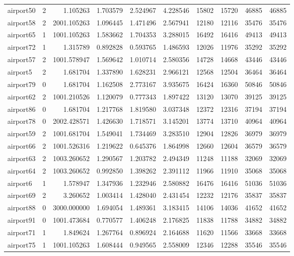 \begin{longtable}{|l|r|r|r|r|r|r|r|r|r|}
airport50 & 2 & 1.105263 & 1.703579 & 2.524967 & 4.228546 & 15802 & 15720 & 46885 & 46885 \\
airport58 & 2 & 2001.105263 & 1.096445 & 1.471496 & 2.567941 & 12180 & 12116 & 35476 & 35476 \\
airport65 & 1 & 1001.105263 & 1.583662 & 1.704353 & 3.288015 & 16492 & 16416 & 49413 & 49413 \\
airport72 & 1 & 1.315789 & 0.892828 & 0.593765 & 1.486593 & 12026 & 11976 & 35292 & 35292 \\
airport57 & 2 & 1001.578947 & 1.569642 & 1.010714 & 2.580356 & 14728 & 14668 & 43446 & 43446 \\
airport5 & 2 & 1.681704 & 1.337890 & 1.628231 & 2.966121 & 12568 & 12504 & 36464 & 36464 \\
airport79 & 0 & 1.681704 & 1.162508 & 2.773167 & 3.935675 & 16424 & 16360 & 50846 & 50846 \\
airport62 & 2 & 1001.210526 & 1.120079 & 0.777343 & 1.897422 & 13120 & 13070 & 39125 & 39125 \\
airport86 & 0 & 1.681704 & 1.217768 & 1.819580 & 3.037348 & 12372 & 12316 & 37194 & 37194 \\
airport78 & 0 & 2002.428571 & 1.426630 & 1.718571 & 3.145201 & 13774 & 13710 & 40964 & 40964 \\
airport59 & 2 & 1001.681704 & 1.549041 & 1.734469 & 3.283510 & 12904 & 12826 & 36979 & 36979 \\
airport66 & 2 & 1001.526316 & 1.219622 & 0.645376 & 1.864998 & 12660 & 12604 & 36579 & 36579 \\
airport63 & 2 & 1003.260652 & 1.290567 & 1.203782 & 2.494349 & 11248 & 11188 & 32069 & 32069 \\
airport64 & 2 & 1003.260652 & 0.992850 & 1.398262 & 2.391112 & 11966 & 11910 & 35068 & 35068 \\
airport6 & 1 & 1.578947 & 1.347936 & 1.232946 & 2.580882 & 16476 & 16416 & 51036 & 51036 \\
airport69 & 2 & 3.260652 & 1.003414 & 1.428040 & 2.431454 & 12232 & 12176 & 35837 & 35837 \\
airport88 & 0 & 3000.000000 & 1.694054 & 1.489361 & 3.183415 & 14106 & 14036 & 41652 & 41652 \\
airport91 & 0 & 1001.473684 & 0.770577 & 1.406248 & 2.176825 & 11838 & 11788 & 34882 & 34882 \\
airport71 & 1 & 1.849624 & 1.267764 & 0.896924 & 2.164688 & 11620 & 11566 & 33668 & 33668 \\
airport75 & 1 & 1001.105263 & 1.608444 & 0.949565 & 2.558009 & 12346 & 12288 & 35546 & 35546 \\

\end{longtable}
